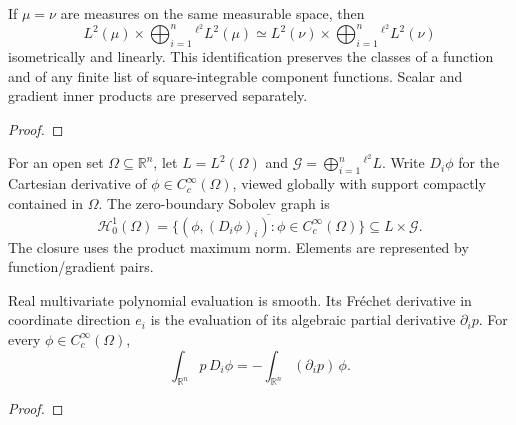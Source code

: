 \begin{supporting}
\begin{theorem}
\label{thm:l2-graph-measure-congr}
\leanok
If $\mu=\nu$ are measures on the same measurable space, then
\[
 L^2(\mu)\times\bigoplus_{i=1}^{n}{}^{\ell^2}L^2(\mu)
 \simeq L^2(\nu)\times\bigoplus_{i=1}^{n}{}^{\ell^2}L^2(\nu)
\]
isometrically and linearly. This identification preserves the classes of a
function and of any finite list of square-integrable component functions.
Scalar and gradient inner products are preserved separately.
\end{theorem}
\begin{proof}
\leanok
\end{proof}

\begin{definition}
\label{def:dirichlet-sobolev-graph}
\leanok
For an open set $\Omega\subseteq\mathbb R^n$, let
$L=L^2(\Omega)$ and $\mathcal G=\bigoplus_{i=1}^n{}^{\ell^2}L$.
Write $D_i\phi$ for the Cartesian derivative of
$\phi\in C_c^\infty(\Omega)$, viewed globally with support compactly contained
in $\Omega$. The zero-boundary Sobolev graph is
\[
 \mathcal H_0^1(\Omega)=
 \overline{\{(\phi,(D_i\phi)_i):\phi\in C_c^\infty(\Omega)\}}
 \subseteq L\times\mathcal G.
\]
The closure uses the product maximum norm. Elements are represented by
function/gradient pairs.
\end{definition}

\begin{theorem}
\label{thm:polynomial-test-calculus}
\leanok
Real multivariate polynomial evaluation is smooth. Its Fr\'echet derivative
in coordinate direction $e_i$ is the evaluation of its algebraic partial
derivative $\partial_i p$. For every $\phi\in C_c^\infty(\Omega)$,
\[
 \int_{\mathbb R^n} p\,D_i\phi
 =-\int_{\mathbb R^n}(\partial_i p)\,\phi.
\]
\end{theorem}
\begin{proof}
\leanok
\end{proof}


\end{supporting}
